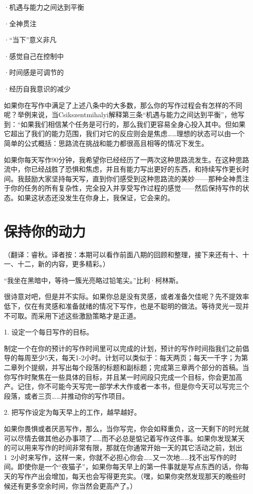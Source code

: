 \documentclass{ctexart}
\begin{document}
·机遇与能力之间达到平衡

·全神贯注

·“当下”意义非凡

·感觉自己在控制中

·时间感是可调节的

·经历自我意识的减少

如果你在写作中满足了上述八条中的大多数，那么你的写作过程会有怎样的不同呢？举例来说，当Csikszentmihalyi解释第三条“机遇与能力之间达到平衡”，他写到：“如果我们相信某个任务是可行的，那么我们更容易全身心投入其中。但如果它超出了我们的能力范围，我们对它的反应则会是焦虑……理想的状态可以由一个简单的公式概括：思路流在挑战和能力都很高且相等的情况下发生。

如果你每天写作90分钟，我希望你已经经历了一两次这种思路流发生。在这种思路流中，你已经战胜了恐惧和焦虑，并且有能力写出更好的东西，和持续写作更长时间。我鼓励大家坚持每天写，直到你们感受到这种思路流的美妙——那种全神贯注于你的任务的所有复杂性，完全投入并享受写作过程的感觉——然后保持写作的状态。如果这状态还没发生在你身上，我保证，它会来的。

\section{保持你的动力}
（翻译：睿秋。译者按：本期可以看作前面八期的回顾和整理，接下来还有十、十一、十二，新的内容，更多精彩。）

“我坐在黑暗中，等待一簇光亮略过铅笔尖。”比利·柯林斯。

很诗意对吧，但是并不实际。如果你总是没有灵感，或者准备欠佳呢？先不提效率低下，仅在有灵感和准备就绪的情况下写作，也是不聪明的做法。等待灵光一现并不可取。而采用下述这些激励策略才是正道。

1. 设定一个每日写作的目标。

制定一个在你的预计的写作时间里可以完成的计划，预计的写作时间指我们之前倡导的每周至少5天，每天1-2小时。计划可以类似于：每天两页；每天一千字；为第二章列个提纲，并写出每个段落的标题和副标题；完成第三章两个部分的首稿。当你写作时聚焦在一些具体的目标，并且某一时间段只完成一个目标，你会更加高产。记住，你不可能今天写完一部学术大作或者一本书，但是你今天可以写完三个段落，或者三页……并推动你的写作项目。

2. 把写作设定为每天早上的工作，越早越好。

如果你畏惧或者厌恶写作，那么，当你写完，你会如释重负，这一天剩下的时光就可以尽情去做其他必办事项了……而不必总是惦记着写作这件事。如果你发现某天的可以用来写作的时间非常有限，那就在你通常开始一天的其它活动之前，划出1~2小时来写作，这样一来，你就不必担心你会……又一次地……找不出写作的时间。即使你是一个“夜猫子”，如果你每天早上的第一件事就是写点东西的话，你每天的写作产出会增加，每天也会写得更充实。（嘿，如果你突然发现那天的晚些时候还有更多空余时间，你当然会更高产了。）
\end{document}
